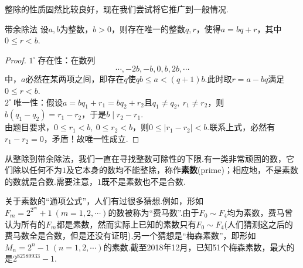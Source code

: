 \documentclass[lang=cn, zihao=5]{elegantbook}
\newcommand{\buzhou}[1]{$#1^{\circ} \ $}
\begin{document}
整除的性质固然比较良好，现在我们尝试将它推广到一般情况.

\begin{theorem}{带余除法}
	设$a,b$为整数，$b>0$，则存在唯一的整数$q,r$，使得$a=bq+r$，其中$0 \leq r <b$.
\end{theorem}
\begin{proof}
	\buzhou{1}存在性：在数列$$\cdots , -2b ,-b , 0 ,b,2b,\cdots $$中，$a$必然在某两项之间，即存在$q$使$qb \leq a < (q+1)b$.此时取$r=a-bq$满足$0 \leq r <b$. \\
	\buzhou{2}唯一性：假设$a=bq_1+r_1=bq_2+r_2$且$q_1 \neq q_2,~r_1 \neq r_2$，则$b(q_1-q_2)=r_1-r_2$，于是$b \mid r_2-r_1$. \\
	由题目要求，$0 \leq r_1 < b,~0 \leq r_2 < b$，则$0 \leq |r_1-r_2| < b$.联系上式，必然有$r_1-r_2=0$，矛盾！故唯一性成立.
\end{proof}

从整除到带余除法，我们一直在寻找整数可除性的下限.有一类非常顽固的数，它们除以任何不为$1$及它本身的数均不能整除，称作\textbf{素数}(prime)；相应地，不是素数的数就是合数.需要注意，$1$既不是素数也不是合数.

关于素数的“通项公式”，人们有过很多猜想.例如，形如$F_m=2^{2^m}+1~(m=1,2,\cdots )$的数被称为“费马数”.由于$F_0 \sim F_4$均为素数，费马曾认为所有的$F_m$都是素数，然而实际上已知的素数只有$F_0 \sim F_4$(人们猜测这之后的费马数全是合数，但是还没有证明).另一个猜想是“梅森素数”，即形如$M_n=2^n-1~(n=1,2,\cdots )$的素数.截至2018年12月，已知51个梅森素数，最大的是$2^{82589933}-1$.
\end{document}
